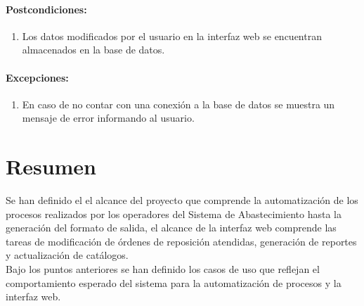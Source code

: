 \paragraph{Postcondiciones:}
\begin{enumerate}
  \item Los datos modificados por el usuario en la interfaz web se encuentran almacenados en la base de datos.
\end{enumerate}
\paragraph{Excepciones:}
\begin{enumerate}
  \item En caso de no contar con una conexión a la base de datos se muestra un mensaje de error informando al usuario.
\end{enumerate}

\section{Resumen}
Se han definido el el alcance del proyecto que comprende la automatización de los procesos realizados por los operadores del Sistema de Abastecimiento hasta la generación del formato de salida, el alcance de la interfaz web comprende las tareas de modificación de órdenes de reposición atendidas, generación de reportes y actualización de catálogos.\\
Bajo los puntos anteriores se han definido los casos de uso que reflejan el comportamiento esperado del sistema para la automatización de procesos y la interfaz web.
